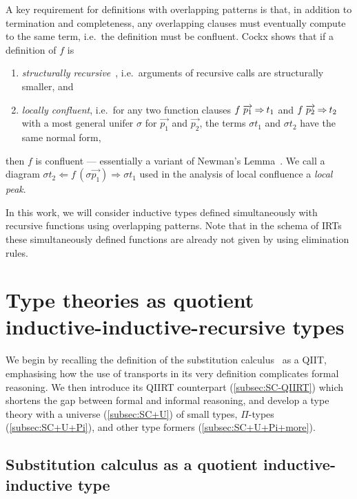 \documentclass[a4paper,UKenglish,numberwithinsect,cleveref,thm-restate]{lipics-v2021}
\begin{document}
A key requirement for definitions with overlapping patterns is that, in addition to termination and completeness, any overlapping clauses must eventually compute to the same term, i.e.\ the definition must be confluent.
Cockx shows that if a definition of $f$ is
\begin{enumerate}
  \item \emph{structurally recursive}~\cite{Abel2002}, i.e.\ arguments of recursive calls are structurally smaller, and
  \item \emph{locally confluent}, i.e.\ for any two function clauses $f\;\overrightarrow{p_1} \mathbin{\Rightarrow} t_1$ and $f\;\overrightarrow{p_2} \mathbin{\Rightarrow} t_2$ with a most general unifer $\sigma$ for $\overrightarrow{p_1}$ and $\overrightarrow{p_2}$, the terms $\sigma t_1$ and $\sigma t_2$ have the same normal form, 
\end{enumerate}
then $f$ is confluent --- essentially a variant of Newman's Lemma~\cite{Newman1942}.
We call a diagram $\sigma t_2 \Leftarrow f\,(\sigma\overrightarrow{p_1}) \Rightarrow \sigma t_1$ used in the analysis of local confluence a \emph{local peak}.

In this work, we will consider inductive types defined simultaneously with recursive functions using overlapping patterns.
Note that in the schema of IRTs these simultaneously defined functions are already not given by using elimination rules.

\section{Type theories as quotient inductive-inductive-recursive types} \label{sec:QIIRTs}

We begin by recalling the definition of the substitution calculus~\cite{Martin-Lof1992} as a QIIT, emphasising how the use of transports in its very definition complicates formal reasoning.
We then introduce its QIIRT counterpart (\cref{subsec:SC-QIIRT}) which shortens the gap between formal and informal reasoning, and develop a type theory with a universe (\cref{subsec:SC+U}) of small types, $\Pi$-types (\cref{subsec:SC+U+Pi}), and other type formers (\cref{subsec:SC+U+Pi+more}).

\subsection{Substitution calculus as a quotient inductive-inductive type} \label{subsec:SC-QIIT}
\end{document}
